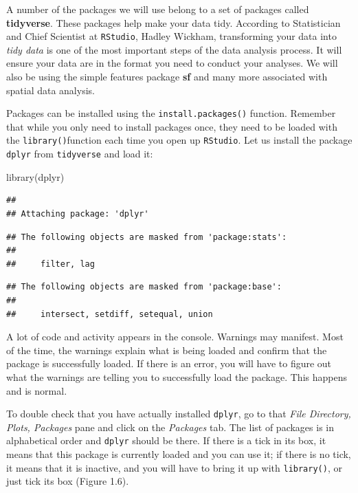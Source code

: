 \documentclass[
]{book}
\newenvironment{Shaded}{\begin{snugshade}}{\end{snugshade}}
\newcommand{\FunctionTok}[1]{\textcolor[rgb]{0.00,0.00,0.00}{#1}}
\newcommand{\NormalTok}[1]{#1}
\begin{document}
A number of the packages we will use belong to a set of packages called \textbf{tidyverse}. These packages help make your data tidy. According to Statistician and Chief Scientist at \texttt{RStudio}, Hadley Wickham, transforming your data into \emph{tidy data} is one of the most important steps of the data analysis process. It will ensure your data are in the format you need to conduct your analyses. We will also be using the simple features package \textbf{sf} and many more associated with spatial data analysis.

Packages can be installed using the \texttt{install.packages()} function. Remember that while you only need to install packages once, they need to be loaded with the \texttt{library()}function each time you open up \texttt{RStudio}. Let us install the package \texttt{dplyr} from \texttt{tidyverse} and load it:

\begin{Shaded}
\begin{Highlighting}[]
\FunctionTok{library}\NormalTok{(dplyr)}
\end{Highlighting}
\end{Shaded}

\begin{verbatim}
## 
## Attaching package: 'dplyr'
\end{verbatim}

\begin{verbatim}
## The following objects are masked from 'package:stats':
## 
##     filter, lag
\end{verbatim}

\begin{verbatim}
## The following objects are masked from 'package:base':
## 
##     intersect, setdiff, setequal, union
\end{verbatim}

A lot of code and activity appears in the console. Warnings may manifest. Most of the time, the warnings explain what is being loaded and confirm that the package is successfully loaded. If there is an error, you will have to figure out what the warnings are telling you to successfully load the package. This happens and is normal.

To double check that you have actually installed \texttt{dplyr}, go to that \emph{File Directory, Plots, Packages} pane and click on the \emph{Packages} tab. The list of packages is in alphabetical order and \texttt{dplyr} should be there. If there is a tick in its box, it means that this package is currently loaded and you can use it; if there is no tick, it means that it is inactive, and you will have to bring it up with \texttt{library()}, or just tick its box (Figure 1.6).
\end{document}
